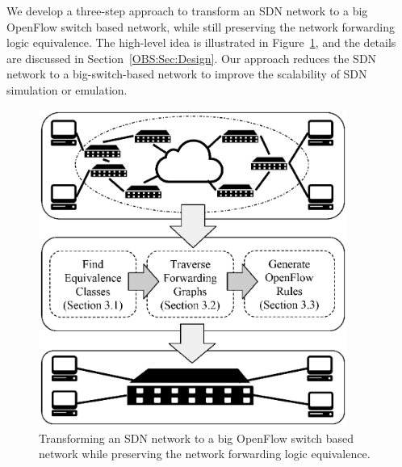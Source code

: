 We develop a three-step approach to transform an SDN network to a big OpenFlow switch based network,
while still preserving the network forwarding logic equivalence.
The high-level idea is illustrated in Figure~\ref{OBS:Fig:BigSimOverview},
and the details are discussed in Section~\ref{OBS:Sec:Design}.
Our approach reduces the SDN network to a big-switch-based network to improve the scalability of SDN simulation or emulation.

\begin{figure}[t]
\centering
\includegraphics[width=0.9\textwidth]{OneBigSwitch/figures/BigSimOverview.eps}
\caption[One Big Switch Abstraction Overview]{Transforming an SDN network to a
    big OpenFlow switch based network while preserving the network forwarding logic equivalence.}
\label{OBS:Fig:BigSimOverview}
\end{figure}

